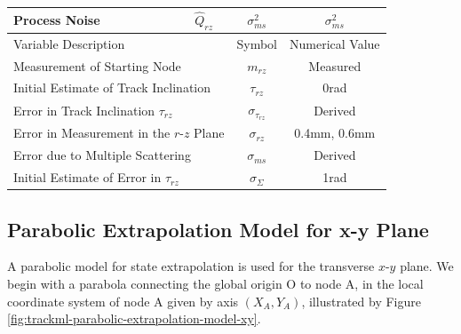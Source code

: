 \begin{table}[!t]
\begin{center}
\begin{tabular}{lccc}
Process Noise
& $\hat{Q}_{rz}$ 
& $\sigma_{ms}^2$
& $\sigma_{ms}^2$
\\  

\bottomrule

\multicolumn{2}{l}{Variable Description} 
& Symbol & Numerical Value  \\
\hline

\multicolumn{2}{l}{Measurement of Starting Node} 
& $m_{rz}$ & Measured \\

\multicolumn{2}{l}{Initial Estimate of Track Inclination} 
& $\tau_{rz}$ & 0rad \\

\multicolumn{2}{l}{Error in Track Inclination $\tau_{rz}$} 
& $\sigma_{\tau_{rz}}$ & Derived \\

\multicolumn{2}{l}{Error in Measurement in the $r$-$z$ Plane} 
& $\sigma_{rz}$ & 0.4mm, 0.6mm  \\

\multicolumn{2}{l}{Error due to Multiple Scattering} 
& $\sigma_{ms}$ & Derived \\

\multicolumn{2}{l}{Initial Estimate of Error in $\tau_{rz}$} 
& $\sigma_{\Sigma}$ & 1rad \\

              

\bottomrule

\end{tabular}
\end{center}
\label{tab:kf-instance-variables-rz}
\end{table}








\clearpage
\subsection{Parabolic Extrapolation Model for x-y Plane}
\label{chapter-6-start-of-derivation}

A parabolic model for state extrapolation is used for the transverse $x$-$y$ plane. We begin with a parabola connecting the global origin O to node A, in the local coordinate system of node A given by axis $(X_A, Y_A)$, illustrated by Figure \ref{fig:trackml-parabolic-extrapolation-model-xy}.


